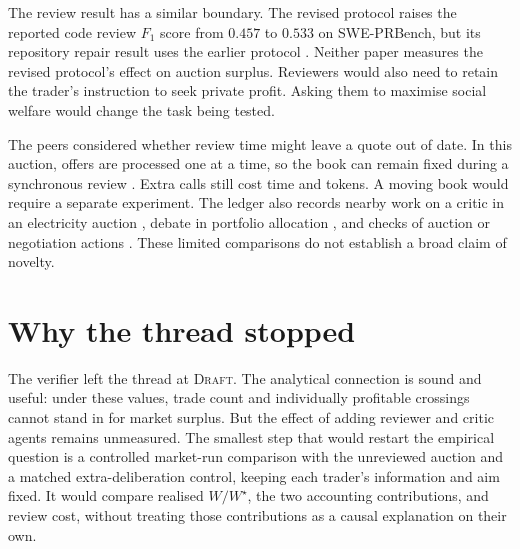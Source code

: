 \documentclass{article}
\begin{document}
The review result has a similar boundary. The revised protocol raises the reported code review \(F_1\) score
from \(0.457\) to \(0.533\) on SWE-PRBench, but its repository repair result uses the earlier protocol
\cite{P}. Neither paper measures the revised protocol's effect on auction surplus. Reviewers would also need
to retain the trader's instruction to seek private profit. Asking them to maximise social welfare would change
the task being tested.

The peers considered whether review time might leave a quote out of date. In this auction, offers are
processed one at a time, so the book can remain fixed during a synchronous review \cite{Q}. Extra calls still
cost time and tokens. A moving book would require a separate experiment. The ledger also records nearby work
on a critic in an electricity auction \cite{electricityCritic}, debate in portfolio allocation
\cite{portfolioDebate}, and checks of auction or negotiation actions \cite{auctionVerification}. These limited
comparisons do not establish a broad claim of novelty.

\section{Why the thread stopped}

The verifier left the thread at \textsc{Draft}. The analytical connection is sound and useful: under these
values, trade count and individually profitable crossings cannot stand in for market surplus. But the effect
of adding reviewer and critic agents remains unmeasured. The smallest step that would restart the empirical
question is a controlled market-run comparison with the unreviewed auction and a matched extra-deliberation
control, keeping each trader's information and aim fixed. It would compare realised \(W/W^{\star}\), the two
accounting contributions, and review cost, without treating those contributions as a causal explanation on
their own.



\end{document}
